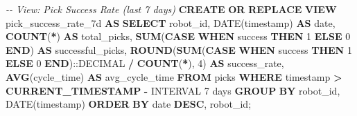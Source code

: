 \documentclass[
]{article}
\newenvironment{Shaded}{\begin{snugshade}}{\end{snugshade}}
\newcommand{\CharTok}[1]{\textcolor[rgb]{0.31,0.60,0.02}{#1}}
\newcommand{\CommentTok}[1]{\textcolor[rgb]{0.56,0.35,0.01}{\textit{#1}}}
\newcommand{\ControlFlowTok}[1]{\textcolor[rgb]{0.13,0.29,0.53}{\textbf{#1}}}
\newcommand{\DataTypeTok}[1]{\textcolor[rgb]{0.13,0.29,0.53}{#1}}
\newcommand{\DecValTok}[1]{\textcolor[rgb]{0.00,0.00,0.81}{#1}}
\newcommand{\FunctionTok}[1]{\textcolor[rgb]{0.13,0.29,0.53}{\textbf{#1}}}
\newcommand{\KeywordTok}[1]{\textcolor[rgb]{0.13,0.29,0.53}{\textbf{#1}}}
\newcommand{\NormalTok}[1]{#1}
\newcommand{\OperatorTok}[1]{\textcolor[rgb]{0.81,0.36,0.00}{\textbf{#1}}}
\newcommand{\StringTok}[1]{\textcolor[rgb]{0.31,0.60,0.02}{#1}}
\begin{document}
\begin{Shaded}
\begin{Highlighting}[]
\CommentTok{{-}{-} View: Pick Success Rate (last 7 days)}
\KeywordTok{CREATE} \KeywordTok{OR} \KeywordTok{REPLACE} \KeywordTok{VIEW}\NormalTok{ pick\_success\_rate\_7d }\KeywordTok{AS}
\KeywordTok{SELECT}
\NormalTok{    robot\_id,}
    \DataTypeTok{DATE}\NormalTok{(}\DataTypeTok{timestamp}\NormalTok{) }\KeywordTok{AS} \DataTypeTok{date}\NormalTok{,}
    \FunctionTok{COUNT}\NormalTok{(}\OperatorTok{*}\NormalTok{) }\KeywordTok{AS}\NormalTok{ total\_picks,}
    \FunctionTok{SUM}\NormalTok{(}\ControlFlowTok{CASE} \ControlFlowTok{WHEN}\NormalTok{ success }\ControlFlowTok{THEN} \DecValTok{1} \ControlFlowTok{ELSE} \DecValTok{0} \ControlFlowTok{END}\NormalTok{) }\KeywordTok{AS}\NormalTok{ successful\_picks,}
    \FunctionTok{ROUND}\NormalTok{(}\FunctionTok{SUM}\NormalTok{(}\ControlFlowTok{CASE} \ControlFlowTok{WHEN}\NormalTok{ success }\ControlFlowTok{THEN} \DecValTok{1} \ControlFlowTok{ELSE} \DecValTok{0} \ControlFlowTok{END}\NormalTok{):}\CharTok{:DECIMAL} \OperatorTok{/} \FunctionTok{COUNT}\NormalTok{(}\OperatorTok{*}\NormalTok{), }\DecValTok{4}\NormalTok{) }\KeywordTok{AS}\NormalTok{ success\_rate,}
    \FunctionTok{AVG}\NormalTok{(cycle\_time) }\KeywordTok{AS}\NormalTok{ avg\_cycle\_time}
\KeywordTok{FROM}\NormalTok{ picks}
\KeywordTok{WHERE} \DataTypeTok{timestamp} \OperatorTok{\textgreater{}} \FunctionTok{CURRENT\_TIMESTAMP} \OperatorTok{{-}} \DataTypeTok{INTERVAL} \StringTok{\textquotesingle{}7 days\textquotesingle{}}
\KeywordTok{GROUP} \KeywordTok{BY}\NormalTok{ robot\_id, }\DataTypeTok{DATE}\NormalTok{(}\DataTypeTok{timestamp}\NormalTok{)}
\KeywordTok{ORDER} \KeywordTok{BY} \DataTypeTok{date} \KeywordTok{DESC}\NormalTok{, robot\_id;}


\end{Highlighting}
\end{Shaded}
\end{document}
